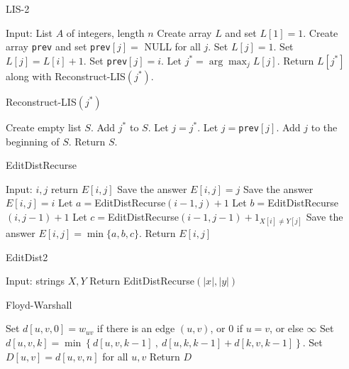 \documentclass[10pt]{article}
\begin{document}
\begin{algorithm}
\caption{LIS-2}
\label{alg:lis2}
\begin{algorithmic}[1]
  \STATE Input: List $A$ of integers, length $n$
  \STATE Create array $L$ and set $L[1] = 1$.
  \STATE Create array \texttt{prev} and set \texttt{prev}$[j] = $ NULL for all $j$.
    \STATE Set $L[j] = 1$.
        \STATE Set $L[j] = L[i] + 1$.
        \STATE Set \texttt{prev}$[j] = i$.
      \ENDIF
    \ENDFOR
  \ENDFOR
  \STATE Let $j^* = \arg\max_j L[j]$.
  \STATE Return $L[j^*]$ along with Reconstruct-LIS$(j^*)$.
\end{algorithmic}
\end{algorithm}

\begin{algorithm}
\caption{Reconstruct-LIS$(j^*)$}
\begin{algorithmic}[1]
  \STATE Create empty list $S$.
  \STATE Add $j^*$ to $S$.
  \STATE Let $j = j^*$.
    \STATE Let $j = $\texttt{prev}$[j]$.
    \STATE Add $j$ to the beginning of $S$.
  \ENDWHILE
  \STATE Return $S$.
\end{algorithmic}
\end{algorithm}

\begin{algorithm}
\caption{EditDistRecurse}
\label{sub:editdistrecur}
\begin{algorithmic}[1]
  \STATE Input: $i, j$
    \STATE return $E[i,j]$
    \STATE Save the answer $E[i,j] = j$
    \STATE Save the answer $E[i,j] = i$
  \ELSE
    \STATE Let $a = $EditDistRecurse$(i-1,j) + 1$
    \STATE Let $b = $EditDistRecurse$(i,j-1) + 1$
    \STATE Let $c = $EditDistRecurse$(i-1,j-1) + 1_{X[i]\neq Y[j]}$
    \STATE Save the answer $E[i,j] = \min\{a,b,c\}$.
  \ENDIF
  \STATE Return $E[i,j]$
\end{algorithmic}
\end{algorithm}

\begin{algorithm}
\caption{EditDist2}
\label{alg:editdist2}
\begin{algorithmic}[1]
  \STATE Input: strings $X,Y$
  \STATE Return EditDistRecurse$(|x|,|y|)$
\end{algorithmic}
\end{algorithm}

\begin{algorithm}
\caption{Floyd-Warshall}
\begin{algorithmic}[1]
  \STATE Set $d[u,v,0] = w_{uv}$ if there is an edge $(u,v)$, or $0$ if $u=v$, or else $\infty$
        \STATE Set $d[u,v,k] = \min\left\{ d[u,v,k-1] ~,~ d[u,k,k-1] + d[k,v,k-1] \right\}$.
      \ENDFOR
    \ENDFOR
  \ENDFOR
  \STATE Set $D[u,v] = d[u,v,n]$ for all $u,v$
  \STATE Return $D$
\end{algorithmic}
\end{algorithm}
\end{document}
